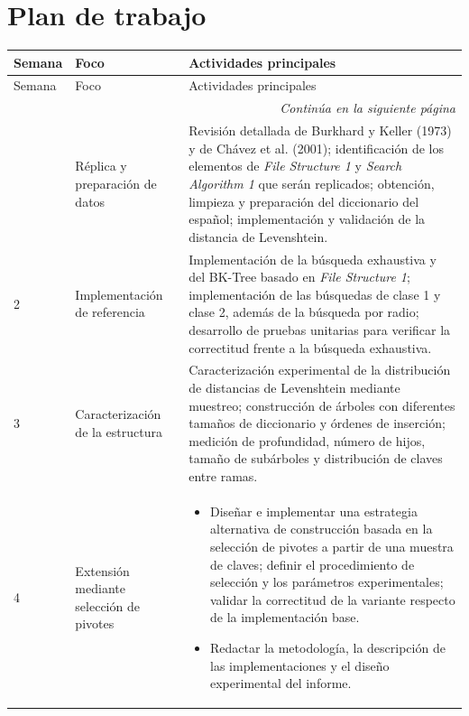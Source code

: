\documentclass[11pt]{article}
\begin{document}
\section{Plan de trabajo}

\begin{longtable}{p{1.5cm}p{3.5cm}p{9.2cm}}
\toprule
Semana & Foco & Actividades principales \\
\midrule
 \endfirsthead
\toprule
Semana & Foco & Actividades principales \\
\midrule
\endhead
\midrule
\multicolumn{3}{r}{\emph{Continúa en la siguiente página}} \\
\endfoot
\bottomrule
\endlastfoot
1 & Réplica y preparación de datos &
Revisión detallada de Burkhard y Keller (1973) y de Ch\'avez et al. (2001); identificación de los elementos de \emph{File Structure 1} y \emph{Search Algorithm 1} que serán replicados; obtención, limpieza y preparación del diccionario del español; implementación y validación de la distancia de Levenshtein. \\

2 & Implementación de referencia &
Implementación de la búsqueda exhaustiva y del BK-Tree basado en \emph{File Structure 1}; implementación de las búsquedas de clase 1 y clase 2, además de la búsqueda por radio; desarrollo de pruebas unitarias para verificar la correctitud frente a la búsqueda exhaustiva. \\

3 & Caracterización de la estructura &
Caracterización experimental de la distribución de distancias de Levenshtein mediante muestreo; construcción de árboles con diferentes tamaños de diccionario y órdenes de inserción; medición de profundidad, número de hijos, tamaño de subárboles y distribución de claves entre ramas. \\

4 & Extensión mediante selección de pivotes &
\begin{itemize}[leftmargin=*, nosep]
\item Diseñar e implementar una estrategia alternativa de construcción basada en la selección de pivotes a partir de una muestra de claves; definir el procedimiento de selección y los parámetros experimentales; validar la correctitud de la variante respecto de la implementación base.
\item Redactar la metodología, la descripción de las implementaciones y el diseño experimental del informe.
\end{itemize} \\


\end{longtable}
\end{document}
